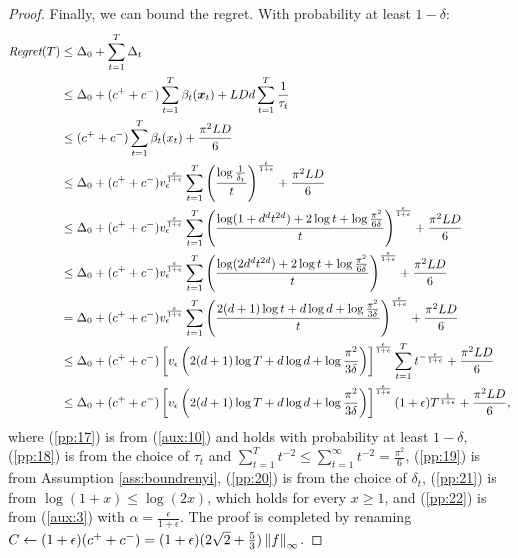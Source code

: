 \documentclass{article}
\begin{document}
\begin{proof}
	Finally, we can bound the regret. With probability at least $1-\delta$:
	\begin{align}
		\Reg(T) &\leq \Delta_0 + \sum_{t=1}^{T}\Delta_t \nonumber\\
		&\leq \Delta_0 + (c^{+}+c^{-})\sum_{t=1}^{T}\beta_t(\vx_t) + LDd\sum_{t=1}^{T}\frac{1}{\tau_t} \label{pp:17}\\
		&\leq (c^{+}+c^{-})\sum_{t=1}^{T}\beta_t(x_t) + \frac{\pi^2LD}{6} \label{pp:18}\\
		&\leq \Delta_0 + (c^{+}+c^{-})v_{\epsilon}^{\frac{\epsilon}{1+\epsilon}}\sum_{t=1}^{T}\left(\frac{\log\frac{1}{\delta_t}}{t}\right)^{\frac{\epsilon}{1+\epsilon}} + \frac{\pi^2LD}{6} \label{pp:19}\\
		&\leq \Delta_0 + (c^{+}+c^{-})v_{\epsilon}^{\frac{\epsilon}{1+\epsilon}}\sum_{t=1}^{T}\left(\frac{
			\log (1+d^dt^{2d}) + 2\log t + \log\frac{\pi^2}{6\delta}
		}{t}\right)^{\frac{\epsilon}{1+\epsilon}} + \frac{\pi^2LD}{6} \label{pp:20}\\
		&\leq \Delta_0 + (c^{+}+c^{-})v_{\epsilon}^{\frac{\epsilon}{1+\epsilon}}\sum_{t=1}^{T}\left(\frac{
		\log (2d^dt^{2d}) + 2\log t + \log\frac{\pi^2}{6\delta}
		}{t}\right)^{\frac{\epsilon}{1+\epsilon}} + \frac{\pi^2LD}{6} \label{pp:21}\\
		&= \Delta_0 + (c^{+}+c^{-})v_{\epsilon}^{\frac{\epsilon}{1+\epsilon}}\sum_{t=1}^{T}\left(\frac{
		2(d+1)\log t + d\log d + \log\frac{\pi^2}{3\delta}
		}{t}\right)^{\frac{\epsilon}{1+\epsilon}} + \frac{\pi^2LD}{6} \nonumber\\
		&\leq \Delta_0 + (c^{+}+c^{-})\left[v_{\epsilon}\left(
			2(d+1)\log T + d\log d + \log\frac{\pi^2}{3\delta}
		\right)\right]^{\frac{\epsilon}{1+\epsilon}}\sum_{t=1}^{T}
		t^{-\frac{\epsilon}{1+\epsilon}} + \frac{\pi^2LD}{6} 	\nonumber\\
		&\leq \Delta_0 + (c^{+}+c^{-})\left[v_{\epsilon}\left(
		2(d+1)\log T + d\log d + \log\frac{\pi^2}{3\delta}
		\right)\right]^{\frac{\epsilon}{1+\epsilon}}(1+\epsilon)T^{\frac{1}{1+\epsilon}}+ \frac{\pi^2LD}{6}, 	\label{pp:22}
	\end{align}
	where (\ref{pp:17}) is from (\ref{aux:10}) and holds with probability at least $1-\delta$, (\ref{pp:18}) is from the choice of $\tau_t$ and $\sum_{t=1}^{T}t^{-2}\leq\sum_{t=1}^{\infty}t^{-2} = \frac{\pi^2}{6}$, (\ref{pp:19}) is from Assumption \ref{ass:boundrenyi}, (\ref{pp:20}) is from the choice of $\delta_t$, (\ref{pp:21}) is from $\log(1+x)\leq\log(2x)$, which holds for every $x\geq 1$, and (\ref{pp:22}) is from  (\ref{aux:3}) with $\alpha=\frac{\epsilon}{1+\epsilon}$. 
	The proof is completed by renaming $C\gets (1+\epsilon)(c^{+}+c^{-}) = (1+\epsilon)(2\sqrt{2} + \frac{5}{3})\norm[\infty]{f}$.
\end{proof}
\end{document}
